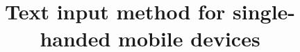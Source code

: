 \documentclass{acm_proc_article-sp}
\begin{document}
\title{Text input method for single-handed mobile devices}

%
%
%
%
%
\end{document}
